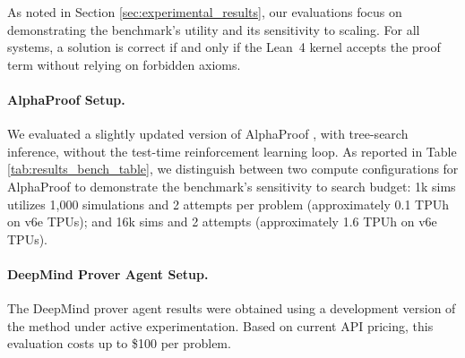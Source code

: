 As noted in Section \ref{sec:experimental_results}, our evaluations focus on demonstrating the benchmark’s utility and its sensitivity to scaling.
For all systems, a solution is correct if and only if the Lean~4 kernel accepts the proof term without relying on forbidden axioms.


\paragraph{AlphaProof Setup.}
We evaluated a slightly updated version of AlphaProof \citep{AlphaProof25}, with tree-search inference, without the test-time reinforcement learning loop.
As reported in Table \ref{tab:results_bench_table}, we distinguish between two compute configurations for AlphaProof to demonstrate the benchmark's sensitivity to search budget: 1k sims utilizes 1,000 simulations and 2 attempts per problem (approximately 0.1 TPUh on v6e TPUs); and 16k sims and 2 attempts (approximately 1.6 TPUh on v6e TPUs).


\paragraph{DeepMind Prover Agent Setup.}
The DeepMind prover agent \citep{DMProverAgent26} results were obtained using a development version of the method under active experimentation.
Based on current API pricing, this evaluation costs up to \$100 per problem.

